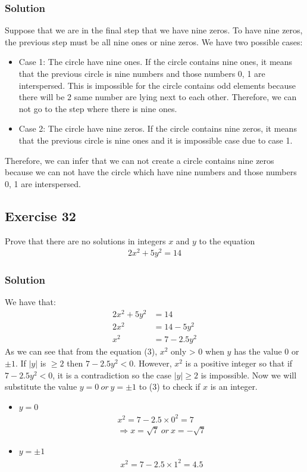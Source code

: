 \documentclass{article}
\begin{document}
\subsubsection*{Solution}
Suppose that we are in the final step that we have nine zeros. To have nine zeros, the previous step must be all nine ones or nine zeros. We have two possible cases:
\begin{itemize}
    \item Case 1: The circle have nine ones. If the circle contains nine ones, it means that the previous circle is nine numbers and those numbers 0, 1 are interspersed. This is impossible for the circle contains odd elements because there will be 2 same number are lying next to each other. Therefore, we can not go to the step where there is nine ones.
    \item Case 2: The circle have nine zeros. If the circle contains nine zeros, it means that the previous circle is nine ones and it is impossible case due to case 1.
\end{itemize}

Therefore, we can infer that we can not create a circle contains nine zeros because we can not have the circle which have nine numbers and those numbers 0, 1 are interspersed.
\subsection*{Exercise 32}
Prove that there are no solutions in integers $x$ and $y$ to the equation
\begin{align*}
    2x^2 + 5y^2 = 14
\end{align*}
\subsubsection*{Solution}
We have that:
\begin{align}
    2x^2 + 5y^2 & = 14\nonumber        \\
    2x^2        & = 14 - 5y^2\nonumber \\
    x^2         & = 7 - 2.5y^2
\end{align}
As we can see that from the equation (3), $x^2$ only > 0 when $y$ has the value 0 or $\pm 1$. If $|y|$ is $\geq 2$ then $7 - 2.5y^2 < 0$. However, $x^2$ is a positive integer so that if $7 - 2.5y^2 < 0$, it is a contradiction so the case $|y| \geq 2$ is impossible. Now we will substitute the value $y = 0 \ or\  y = \pm 1$ to (3) to check if $x$ is an integer.
\begin{itemize}
    \item $y = 0$
          \begin{align*}
              x^2 = 7 - 2.5\times 0^2 = 7 \\
              \Rightarrow x = \sqrt{7} \ or \ x = -\sqrt{7}
          \end{align*}
    \item $y = \pm 1$
          \begin{align*}
              x^2 = 7 - 2.5\times 1^2 = 4.5
          \end{align*}
\end{itemize}
\end{document}
